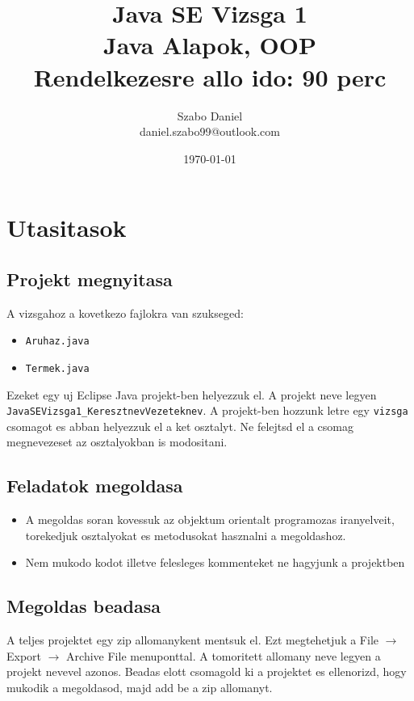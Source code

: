 \documentclass{article}
\title{%
Java SE Vizsga 1\\
\large Java Alapok, OOP\\
\large Rendelkezesre allo ido: 90 perc}
\author{Szabo Daniel\\daniel.szabo99@outlook.com}
\date{\today}
\begin{document}
\maketitle

\section{Utasitasok}

\subsection{Projekt megnyitasa}

A vizsgahoz a kovetkezo fajlokra van szukseged:
\begin{itemize}
    \item \lstinline{Aruhaz.java}
    \item \lstinline{Termek.java}
\end{itemize}
Ezeket egy uj Eclipse Java projekt-ben helyezzuk el. A projekt neve legyen \lstinline{JavaSEVizsga1_KeresztnevVezeteknev}. A projekt-ben hozzunk letre egy \lstinline{vizsga} csomagot es abban helyezzuk el a ket osztalyt. Ne felejtsd el a csomag megnevezeset az osztalyokban is modositani.

\subsection{Feladatok megoldasa}

\begin{itemize}
    \item A megoldas soran kovessuk az objektum orientalt programozas iranyelveit, torekedjuk osztalyokat es metodusokat hasznalni a megoldashoz.
    \item Nem mukodo kodot illetve felesleges kommenteket ne hagyjunk a projektben
\end{itemize}

\subsection{Megoldas beadasa}

A teljes projektet egy zip allomanykent mentsuk el. Ezt megtehetjuk a File $\rightarrow$ Export $\rightarrow$ Archive File menuponttal. A tomoritett allomany neve legyen a projekt nevevel azonos. Beadas elott csomagold ki a projektet es ellenorizd, hogy mukodik a megoldasod, majd add be a zip allomanyt.

\newpage
\end{document}
